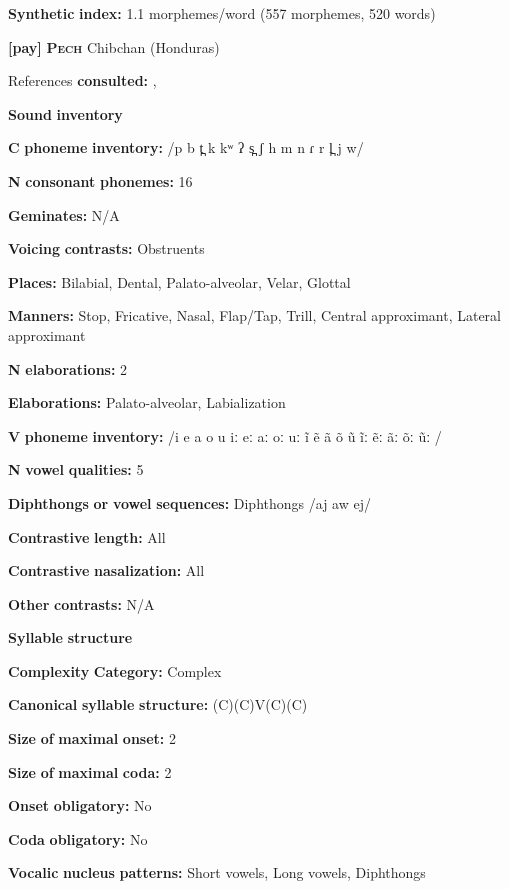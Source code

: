 \begin{styleBody}
\textbf{Synthetic} \textbf{index:} 1.1 morphemes/word (557 morphemes, 520 words)

\textbf{[pay]}   \textbf{\textsc{Pech}}  Chibchan (Honduras)

References \textbf{consulted:} \citet{Holt1986}, \citet{Holt1999}

\textbf{Sound} \textbf{inventory}

\textbf{C} \textbf{phoneme} \textbf{inventory:} /p b t̪ k kʷ ʔ s̪ ʃ h m n ɾ r l̪ j w/

\textbf{N} \textbf{consonant} \textbf{phonemes:} 16

\textbf{Geminates:} N/A

\textbf{Voicing} \textbf{contrasts:} Obstruents

\textbf{Places:} Bilabial, Dental, Palato-alveolar, Velar, Glottal

\textbf{Manners:} Stop, Fricative, Nasal, Flap/Tap, Trill, Central approximant, Lateral approximant

\textbf{N} \textbf{elaborations:} 2

\textbf{Elaborations:} Palato-alveolar, Labialization

\textbf{V} \textbf{phoneme} \textbf{inventory:} /i e a o u iː eː aː oː uː ĩ ẽ ã õ ũ ĩː ẽː ãː õː ũː /

\textbf{N} \textbf{vowel} \textbf{qualities:} 5

\textbf{Diphthongs} \textbf{or} \textbf{vowel} \textbf{sequences:} Diphthongs /aj aw ej/

\textbf{Contrastive} \textbf{length:} All

\textbf{Contrastive} \textbf{nasalization:} All

\textbf{Other} \textbf{contrasts:} N/A

\textbf{Syllable} \textbf{structure}

\textbf{Complexity} \textbf{Category:} Complex

\textbf{Canonical} \textbf{syllable} \textbf{structure:} (C)(C)V(C)(C) \citep[20-21]{Holt1999}

\textbf{Size} \textbf{of} \textbf{maximal} \textbf{onset:} 2

\textbf{Size} \textbf{of} \textbf{maximal} \textbf{coda:} 2

\textbf{Onset} \textbf{obligatory:} No

\textbf{Coda} \textbf{obligatory:} No

\textbf{Vocalic} \textbf{nucleus} \textbf{patterns:} Short vowels, Long vowels, Diphthongs


\end{styleBody}
